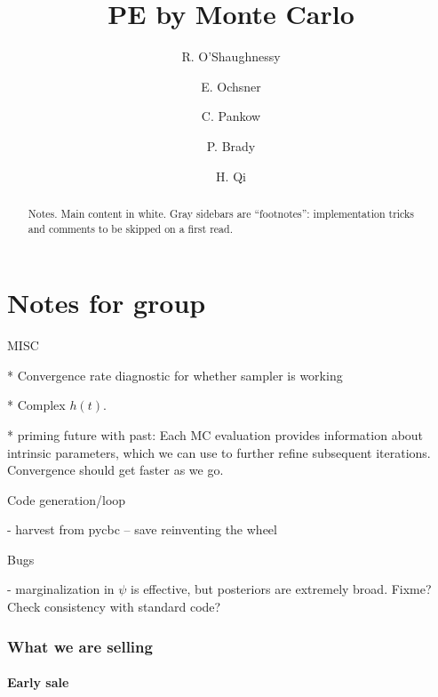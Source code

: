 \documentclass[twocolumn,prd,nofootinbib]{revtex4}
\newcommand\editremark[1]{{\color{red} #1}}
\begin{document}
\title{PE by Monte Carlo}
\author{R. O'Shaughnessy}
\author{E. Ochsner}
\author{C. Pankow}
\author{P. Brady}
\author{H. Qi}
\begin{abstract}
Notes. Main content in white.  Gray sidebars are ``footnotes'': implementation tricks and comments to be skipped on a
first read.
\end{abstract}
\maketitle
\tableofcontents
\part{Notes for group}
\nocite{gwastro-HarryFairhurst-CoherentTargetedSearch}


\editremark{MISC}

* Convergence rate diagnostic for whether sampler is working

* Complex $h(t)$.

* \editremark{priming future with past}: Each MC evaluation provides information about intrinsic parameters, which we can use
to further refine subsequent iterations.  Convergence should get faster as we go.

\editremark{Code generation/loop}

- harvest from pycbc -- save reinventing the wheel


\editremark{Bugs}

 - marginalization in $\psi$ is effective, but posteriors are extremely broad.  Fixme?  Check consistency with standard code?

\section{What we are selling}

\subsection{Early sale}
\end{document}
